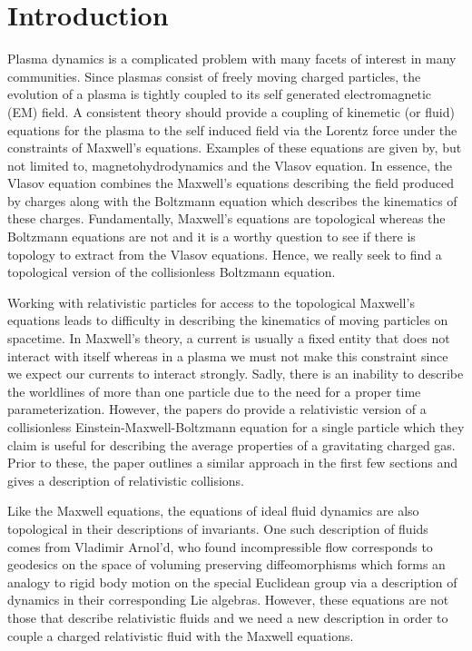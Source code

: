 \documentclass[conf]{new-aiaa}
\begin{document}
\section{Introduction}
Plasma dynamics is a complicated problem with many facets of interest in many communities. Since plasmas consist of freely moving charged particles, the evolution of a plasma is tightly coupled to its self generated electromagnetic (EM) field. A consistent theory should provide a coupling of kinemetic (or fluid) equations for the plasma to the self induced field via the Lorentz force under the constraints of Maxwell's equations. Examples of these equations are given by, but not limited to, magnetohydrodynamics and the Vlasov equation. In essence, the Vlasov equation combines the Maxwell's equations describing the field produced by charges along with the Boltzmann equation which describes the kinematics of these charges. Fundamentally, Maxwell's equations are topological \cite{delphenich_axioms_2005, hehl_foundations_2003} whereas the Boltzmann equations are not and it is a worthy question to see if there is topology to extract from the Vlasov equations. Hence, we really seek to find a topological version of the collisionless Boltzmann equation.

Working with relativistic particles for access to the topological Maxwell's equations leads to difficulty in describing the kinematics of moving particles on spacetime. In Maxwell's theory, a current is usually a fixed entity that does not interact with itself whereas in a plasma we must not make this constraint since we expect our currents to interact strongly. Sadly, there is an inability to describe the worldlines of more than one particle due to the need for a proper time parameterization. However, the papers \cite{sarbach_relativistic_2013, sarbach_tangent_2014, sarbach_geometry_2014} do provide a relativistic version of a collisionless Einstein-Maxwell-Boltzmann equation for a single particle which they claim is useful for describing the average properties of a gravitating charged gas. Prior to these, the paper \cite{bichteler_cauchy_1967} outlines a similar approach in the first few sections and gives a description of relativistic collisions.

Like the Maxwell equations, the equations of ideal fluid dynamics are also topological in their descriptions of invariants. One such description of fluids comes from Vladimir Arnol'd, who found incompressible flow corresponds to geodesics on the space of voluming preserving diffeomorphisms which forms an analogy to rigid body motion on the special Euclidean group via a description of dynamics in their corresponding Lie algebras. However, these equations are not those that describe relativistic fluids and we need a new description in order to couple a charged relativistic fluid with the Maxwell equations.
\end{document}
